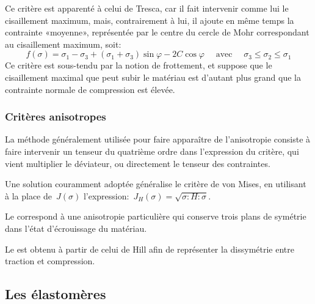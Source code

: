 Ce critère est apparenté à celui de Tresca, car il fait intervenir comme lui le cisaillement maximum, mais, contrairement à lui, il ajoute en même temps la contrainte «moyenne», représentée par le centre du cercle de Mohr correspondant au cisaillement maximum, soit:
\begin{equation} f(\sigma) = \sigma_1 - \sigma_3 + (\sigma_1 + \sigma_3) \sin\varphi - 2C\cos \varphi \quad
\text{ avec } \quad \sigma_3 \le \sigma_2 \le \sigma_1 \end{equation}
Ce critère est sous-tendu par la notion de frottement, et suppose que le cisaillement maximal que peut subir le matériau est d'autant plus grand que la contrainte normale de compression est élevée.

\medskip
\subsubsection{Critères anisotropes}

La méthode généralement utilisée pour faire apparaître de l'anisotropie consiste à faire intervenir un tenseur du quatrième ordre dans l'expression du critère, qui vient multiplier le déviateur, ou directement le tenseur des contraintes.

Une solution couramment adoptée généralise le critère de von Mises, en utilisant à la place de~$J(\sigma)$ l'expression:~$J_H(\sigma) = \sqrt{\sigma: H: \sigma}$.

\medskip
Le  correspond à une anisotropie particulière qui conserve trois plans de symétrie dans l'état d'écrouissage du matériau.

\medskip
Le  est obtenu à partir de celui de Hill afin de représenter la dissymétrie entre traction et compression.







\medskip
\subsection{Les élastomères}

